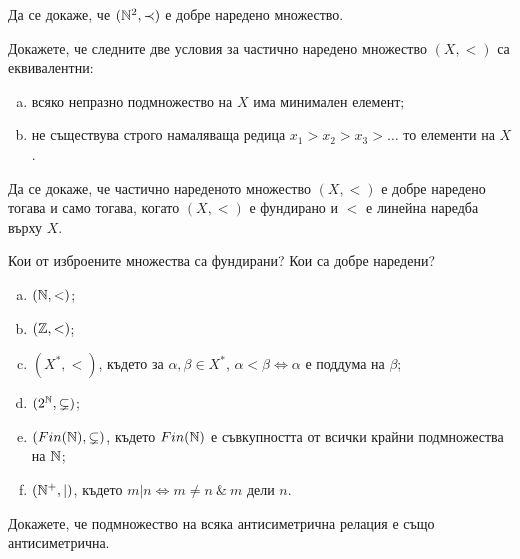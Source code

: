 \begin{problem}
  Да се докаже, че $(\mathbb{N}^2,\prec)$ е добре наредено множество.
\end{problem}

\begin{problem}
  Докажете, че следните две условия за частично наредено множество $(X,<)$ са еквивалентни:
  \begin{enumerate}[a)]
  \item
    всяко непразно подмножество на $X$ има минимален елемент;
  \item
    не съществува строго намаляваща редица $x_1>x_2>x_3>\dots$ то елементи на $X$.
  \end{enumerate}
\end{problem}

\begin{problem}
  Да се докаже, че частично нареденото множество $(X,<)$ е добре наредено тогава и само тогава, когато 
  $(X,<)$ е фундирано и $<$ е линейна наредба върху $X$.
\end{problem}

\begin{problem}%
  Кои от изброените множества са фундирани? Кои са добре наредени?
  \begin{enumerate}[a)]
  \item
    $(\mathbb{N},<)$;
  \item
    $(\mathbb{Z},<)$;
  \item
    $(X^*, <)$, където за $\alpha,\beta\in X^*$, $\alpha < \beta \iff \alpha\mbox{ е поддума на }\beta$;
  \item
    $(2^{\mathbb{N}},\subsetneq)$;
  \item
    $(Fin(\mathbb{N}),\subsetneq)$, където $Fin(\mathbb{N})$ е съвкупността от всички крайни подмножества на $\mathbb{N}$;
  \item
    $(\mathbb{N}^+,|)$, където $m|n \iff m\neq n\ \&\ m\mbox{ дели }n$.
  \end{enumerate}
\end{problem}

\begin{problem}
  Докажете, че подмножество на всяка антисиметрична релация е също антисиметрична.
\end{problem}



